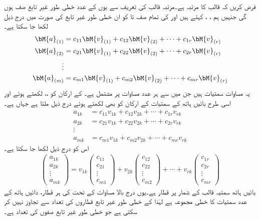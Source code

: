 فرض کریں کہ  قالب  کا مرتبہ  ہے۔مرتبہ قالب کی تعریف سے یوں  کے  عدد خطی طور غیر تابع صف ہوں گی  جنہیں ہم ، ،  کہتے ہیں اور  کی  تمام صف  تا  کو ان خطی طور غیر تابع کی صورت میں درج ذیل لکھا جا سکتا ہے۔
\begin{align*}
\bM{a}_{(1)}&=c_{11}\bM{v}_{(1)}+c_{12}\bM{v}_{(2)}+\cdots+c_{1r}\bM{v}_{(r)}\\
\bM{a}_{(2)}&=c_{21}\bM{v}_{(1)}+c_{22}\bM{v}_{(2)}+\cdots+c_{2r}\bM{v}_{(r)}\\
\vdots\\
\bM{a}_{(m)}&=c_{m1}\bM{v}_{(1)}+c_{m2}\bM{v}_{(2)}+\cdots+c_{mr}\bM{v}_{(r)}
\end{align*}
یہ مساوات سمتیات ہیں جن میں سے ہر  عدد مساوات پر مشتمل ہے۔ کے ارکان کو ،، لکھتے ہوئے اور اسی طرح بائیں ہاتھ کے سمتیات کے ارکان کو بھی لکھتے ہوئے درج ذیل ملتا ہے جہاں  ہے۔
\begin{align*}
a_{1k}&=c_{11}v_{1k}+c_{12}v_{2k}+\cdots+c_{1r}v_{rk}\\
a_{2k}&=c_{21}v_{1k}+c_{22}v_{2k}+\cdots+c_{2r}v_{rk}\\
\vdots\\
a_{mk}&=c_{m1}v_{1k}+c_{m2}v_{2k}+\cdots+c_{mr}v_{rk}
\end{align*} 
اس کو درج ذیل لکھا جا سکتا ہے۔
\begin{align*}
\begin{pmatrix}a_{1k}\\a_{2k}\\ \vdots\\ a_{mk}\end{pmatrix}=
v_{1k}\begin{pmatrix}c_{11}\\ c_{21} \\ \vdots\\ c_{m1}   \end{pmatrix}+v_{2k}\begin{pmatrix}c_{12}\\ c_{22} \\ \vdots\\ c_{m2}   \end{pmatrix}+\cdots+v_{rk}\begin{pmatrix}c_{1r}\\ c_{2r} \\ \vdots\\ c_{mr}   \end{pmatrix}
\end{align*}
بائیں ہاتھ سمتیہ  قالب کے   شمار پر قطار ہے۔یوں درج بالا مساوات کے تحت  کی  ہر قطار، دائیں ہاتھ کے  عدد سمتیات کا خطی مجموعہ ہے لہٰذا  کے خطی طور غیر تابع قطاروں کی تعداد  سے تجاوز نہیں کر سکتی ہے جو خطی طور غیر تابع صفوں کی تعداد ہے۔

